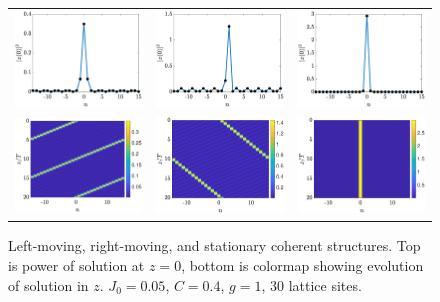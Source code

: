 \documentclass{article}
\begin{document}
\begin{figure}[H]
    \centering
    \begin{tabular}{ccc}
    \includegraphics[width=5cm]{leftsol} &
    \includegraphics[width=5cm]{rightsol} &
    \includegraphics[width=5cm]{statsol} \\
    \includegraphics[width=5cm]{leftcolormap} &
    \includegraphics[width=5cm]{rightcolormap} &
    \includegraphics[width=5cm]{statcolormap} 
    \end{tabular}
    \caption{Left-moving, right-moving, and stationary coherent structures. Top is power of solution at $z=0$, bottom is colormap showing evolution of solution in $z$. $J_0 = 0.05$, $C=0.4$, $g=1$, 30 lattice sites.}
    \label{fig:coherent}
\end{figure}








\end{document}
